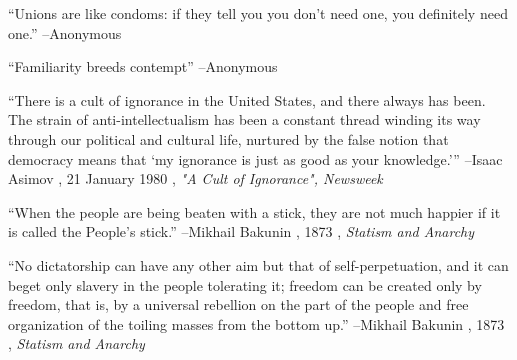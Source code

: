 \documentclass{article}%
\begin{document}
\vspace{1mm}%
\begin{minipage}{\textwidth}%
\flushleft%
“Unions are like condoms: if they tell you you don't need one, you definitely need one.”%
\linebreak%
\vspace{1mm}%
–Anonymous%
\linebreak%
\vspace{1mm}%
\end{minipage}%
\linebreak%
\vspace{1mm}%
\begin{minipage}{\textwidth}%
\flushleft%
“Familiarity breeds contempt”%
\linebreak%
\vspace{1mm}%
–Anonymous%
\linebreak%
\vspace{1mm}%
\end{minipage}%
\linebreak%
\vspace{1mm}%
\begin{minipage}{\textwidth}%
\flushleft%
“There is a cult of ignorance in the United States, and there always has been. The strain of anti{-}intellectualism has been a constant thread winding its way through our political and cultural life, nurtured by the false notion that democracy means that ‘my ignorance is just as good as your knowledge.’”%
\linebreak%
\vspace{1mm}%
–Isaac Asimov%
, 21 January 1980%
, \textit{"A Cult of Ignorance", Newsweek}%
\linebreak%
\vspace{1mm}%
\end{minipage}%
\linebreak%
\vspace{1mm}%
\begin{minipage}{\textwidth}%
\flushleft%
“When the people are being beaten with a stick, they are not much happier if it is called the People's stick.”%
\linebreak%
\vspace{1mm}%
–Mikhail Bakunin%
, 1873%
, \textit{Statism and Anarchy}%
\linebreak%
\vspace{1mm}%
\end{minipage}%
\linebreak%
\vspace{1mm}%
\begin{minipage}{\textwidth}%
\flushleft%
“No dictatorship can have any other aim but that of self{-}perpetuation, and it can beget only slavery in the people tolerating it; freedom can be created only by freedom, that is, by a universal rebellion on the part of the people and free organization of the toiling masses from the bottom up.”%
\linebreak%
\vspace{1mm}%
–Mikhail Bakunin%
, 1873%
, \textit{Statism and Anarchy}%
\linebreak%
\vspace{1mm}%
\end{minipage}%
\end{document}
